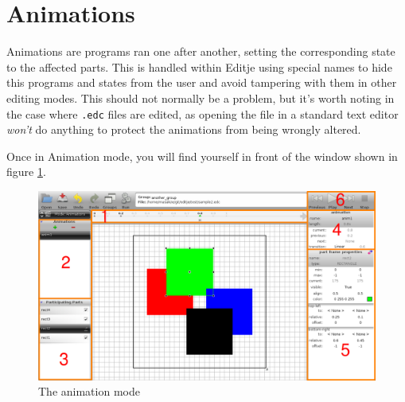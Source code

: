 \documentclass[a4paper]{profusion}
\begin{document}
\section{Animations}
\label{sec:animations}

Animations are programs ran one after another, setting the
corresponding state to the affected parts. This is handled within
Editje using special names to hide this programs and states from the
user and avoid tampering with them in other editing modes. This should
not normally be a problem, but it's worth noting in the case where
\texttt{.edc} files are edited, as opening the file in a standard text
editor \emph{won't} do anything to protect the animations from being
wrongly altered.

Once in Animation mode, you will find yourself in front of the window
shown in figure \ref{fig:animation_mode_numbers}.

\begin{figure}[h!]
  \centering
  \includegraphics[width=1.0\textwidth]{images/animation_mode_numbers.png}
  \caption{The animation mode}
  \label{fig:animation_mode_numbers}
\end{figure}
\end{document}
